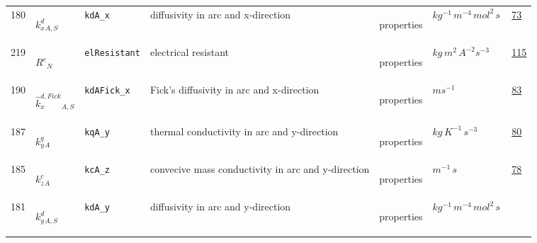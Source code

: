 \begin{longtable}{|p{1cm}|p{2.5cm}|p{4.5cm}|p{8cm}|p{3.0cm}|p{3cm}|p{1cm}|}
                 \\
            180
             & \hypertarget{"v:180"}{ $ {{k^d_x}}{_{A, S}} $}
             & \verb|kdA_x|
             & diffusivity in arc and x-direction
             & \begin{lay}properties \end{lay}
             & $ kg^{-1} \,m^{-4} \,mol^{2} \,s \, $
             &                 \hyperlink{"e:73"}{ 73 }
                 \\
            219
             & \hypertarget{"v:219"}{ $ {{R^e}}{_{N}} $}
             & \verb|elResistant|
             & electrical resistant
             & \begin{lay}properties \end{lay}
             & $ kg \,m^{2} \,A^{-2} s^{-3} \, $
             &                 \hyperlink{"e:115"}{ 115 }
                 \\
            190
             & \hypertarget{"v:190"}{ $ {{\hat{k}^{d,Fick}_x}}{_{A, S}} $}
             & \verb|kdAFick_x|
             & Fick's diffusivity in arc and x-direction
             & \begin{lay}properties \end{lay}
             & $ m s^{-1} \, $
             &                 \hyperlink{"e:83"}{ 83 }
                 \\
            187
             & \hypertarget{"v:187"}{ $ {{k^q_y}}{_{A}} $}
             & \verb|kqA_y|
             & thermal conductivity in arc and y-direction
             & \begin{lay}properties \end{lay}
             & $ kg \,K^{-1} \,s^{-3} \, $
             &                 \hyperlink{"e:80"}{ 80 }
                 \\
            185
             & \hypertarget{"v:185"}{ $ {{k^c_z}}{_{A}} $}
             & \verb|kcA_z|
             & convecive mass conductivity in arc and y-direction
             & \begin{lay}properties \end{lay}
             & $ m^{-1} \,s \, $
             &                 \hyperlink{"e:78"}{ 78 }
                 \\
            181
             & \hypertarget{"v:181"}{ $ {{k^d_y}}{_{A, S}} $}
             & \verb|kdA_y|
             & diffusivity in arc and y-direction
             & \begin{lay}properties \end{lay}
             & $ kg^{-1} \,m^{-4} \,mol^{2} \,s \, $

\end{longtable}
